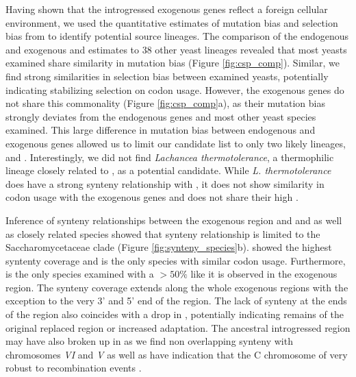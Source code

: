 \documentclass[12pt]{article}
\begin{document}
Having shown that the introgressed exogenous genes reflect a foreign cellular environment, we used the quantitative estimates of mutation bias \DM and selection bias \DE from \ROC to identify potential source lineages.
The comparison of the endogenous and exogenous \DM and \DE estimates to 38 other yeast lineages revealed that most yeasts examined share similarity in mutation bias (Figure \ref{fig:csp_comp}).
Similar, we find strong similarities in selection bias between examined yeasts, potentially indicating stabilizing selection on codon usage.
However, the exogenous genes do not share this commonality (Figure \ref{fig:csp_comp}a), as their mutation bias strongly deviates from the endogenous genes and most other yeast species examined. 
This large difference in mutation bias between endogenous and exogenous genes allowed us to limit our candidate list to only two likely lineages, \dubl and \gossypii.
Interestingly, we did not find \textit{Lachancea thermotolerance}, a thermophilic lineage closely related to \kluyveri, as a potential candidate.
While \textit{L. thermotolerance} does have a strong synteny relationship with \kluyveri, it does not show similarity in codon usage with the exogenous genes and does not share their high \GC.

Inference of synteny relationships between the exogenous region and \dubl and \gossypii as well as closely related species showed that synteny relationship is limited to the Saccharomycetaceae clade (Figure \ref{fig:synteny_species}b).
\gossypii showed the highest syntenty coverage and is the only species with similar codon usage.
Furthermore, \gossypii is the only species examined with a \GC $> 50 \%$ like it is observed in the exogenous region.
The synteny coverage extends along the whole exogenous regions with the exception to the very 3' and 5' end of the region. 
The lack of synteny at the ends of the region also coincides with a drop in \GC, potentially indicating remains of the original replaced region or increased adaptation.
The ancestral introgressed region may have also broken up in \gossypii as we find non overlapping synteny with chromosomes \emph{VI} and \emph{V} as well as have indication that the C chromosome of \kluyveri very robust to recombination events \citep{payen2009, vakirlis2016}. 
\end{document}
